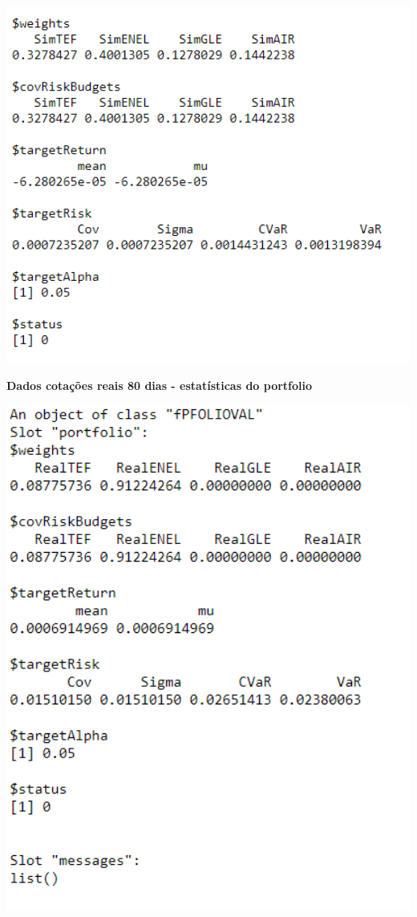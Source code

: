 \documentclass[
  12pt,
  a4paper,
  openany]{book}
\begin{document}
\begin{center}
\begin{minipage}{0.90\linewidth}
    \centering
    \includegraphics[width=2\textwidth]{image/vi.png}
\end{minipage}
\end{center}


\newpage

\begin{center}
 {\normalfont\Large\bfseries Dados cotações reais 80 dias -  estatísticas do portfolio}
\end{center}

\begin{center}
\begin{minipage}{0.90\linewidth}
    \centering
    \includegraphics[width=2\textwidth]{image/realport.png}
\end{minipage}
\end{center}
\end{document}
